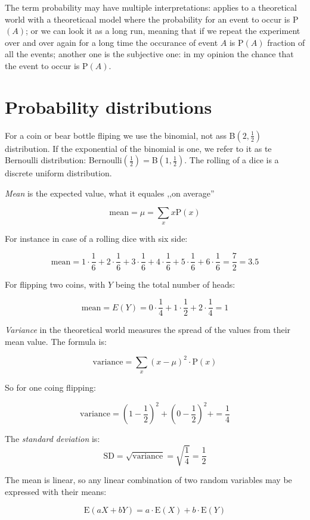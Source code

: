 The term probability may have multiple interpretations: applies to a theoretical
world with a theoreticaal model where the probability for an event to occur is
P$(A)$; or we can look it as a long run, meaning that if we repeat the
experiment over and over again for a long time the occurance of event $A$ is
P$(A)$ fraction of all the events; another one is the subjective one: in my
opinion the chance that the event to occur is P$(A)$.

\section{Probability distributions}

For a coin or bear bottle fliping we use the binomial, not ass
B$(2,\frac{1}{2})$  distribution. If the exponential of the binomial is
one, we refer to it as te Bernoulli distribution: Bernoulli$(\frac{1}{2}) =
$B$(1, \frac{1}{2})$. The rolling of a dice is a discrete uniform
distribution.

\emph{Mean} is the expected value, what it equales ,,on average''

\[ \mbox{mean} = \mu = \sum_{x}x\mbox{P}(x)
\]

For instance in case of a rolling dice with six side:

\[
	\mbox{mean} =
	1\cdot\frac{1}{6}+2\cdot\frac{1}{6}+3\cdot\frac{1}{6}+4\cdot\frac{1}{6}+5\cdot\frac{1}{6}+6\cdot\frac{1}{6}=\frac{7}{2}=3.5
\]

For flipping two coins, with $Y$ being the total number of heads:

\[
	\mbox{mean}=E(Y)= 0\cdot\frac{1}{4}+1\cdot\frac{1}{2}+2\cdot\frac{1}{4} = 1
\]

\emph{Variance} in the theoretical world measures the spread of the values from
their mean value. The formula is:

\[
	\mbox{variance} = \sum_{x} (x-\mu)^2\cdot\mbox{P}(x)
\]

So for one coing flipping:

\[ \mbox{variance} =  \left(1-\frac{1}{2}\right)^2 +
	\left(0-\frac{1}{2}\right)^2 + =  \frac{1}{4} \]

The \emph{standard deviation} is:
\[ \mbox{SD} = \sqrt{\mbox{variance}} = \sqrt{\frac{1}{4}} = \frac{1}{2}
\]

The mean is linear, so any linear combination of two random variables may be
expressed with their means:

\[ \mbox{E}(aX+bY) = a\cdot\mbox{E}(X) + b\cdot\mbox{E}(Y)\]

